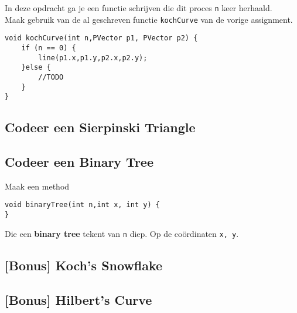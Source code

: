 In deze opdracht ga je een functie schrijven die dit proces \texttt{n} keer herhaald.\\
Maak gebruik van de al geschreven functie \texttt{kochCurve} van de vorige assignment.
\begin{lstlisting}
void kochCurve(int n,PVector p1, PVector p2) {
    if (n == 0) {
        line(p1.x,p1.y,p2.x,p2.y);
    }else {
        //TODO
    }
}
\end{lstlisting}

\subsection{Codeer een Sierpinski Triangle}

\subsection{Codeer een Binary Tree}
Maak een method
\begin{lstlisting}
void binaryTree(int n,int x, int y) {
}
\end{lstlisting}
Die een \textbf{binary tree} tekent van \texttt{n} diep. Op de co\"ordinaten \texttt{x, y}.



\subsection{[Bonus] Koch's Snowflake}

\subsection{[Bonus] Hilbert's Curve}


